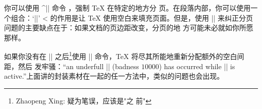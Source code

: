 
你可以使用 ^|\eject| 命令 \ctsref{\eject}，强制 \TeX{} 在特定的地方分
页。在段落内部，你可以使用一个组合：`|\vadjust{\vfill\eject}|'
\ctsref{\vadjust}
^^| 的作用是让 \TeX{} 使用空白来填充页面。但是，使用
|\eject| 来纠正分页问题的主要缺点在于：如果文档的页边距改变，分页的地
方可能未必就如你所愿那样。


如果你没有在 |\eject| 之后\footnote{Zhaopeng Xing: 疑为笔误，应该是"之
  前"}使用 |\vfill| 命令，\TeX{} 将尽其所能地重新分配额外的空白间距，然后
发牢骚：“an underfull |\vbox| (badness $10000$) has occurred while |\output| is
 active.”上面讲的封装素材在一起的任一方法中，类似的问题也会出现。


